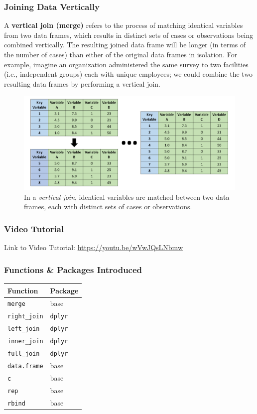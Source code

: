 \documentclass[]{book}
\begin{document}
\subsubsection{Joining Data Vertically}\label{joining-data-vertically}

A \textbf{vertical join (merge)} refers to the process of matching
identical variables from two data frames, which results in distinct sets
of cases or observations being combined vertically. The resulting joined
data frame will be longer (in terms of the number of cases) than either
of the original data frames in isolation. For example, imagine an
organization administered the same survey to two facilities (i.e.,
independent groups) each with unique employees; we could combine the two
resulting data frames by performing a vertical join.

\begin{figure}
\centering
\includegraphics{vertical_join.png}
\caption{In a \emph{vertical join}, identical variables are matched
between two data frames, each with distinct sets of cases or
observations.}
\end{figure}

\subsubsection{Video Tutorial}\label{video-tutorial}

Link to Video Tutorial: \url{https://youtu.be/wVwJQsLNbmw}

\subsubsection{Functions \& Packages
Introduced}\label{functions-packages-introduced}

\begin{longtable}[]{@{}ll@{}}
\toprule
Function & Package\tabularnewline
\midrule
\endhead
\texttt{merge} & base\tabularnewline
\texttt{right\_join} & \texttt{dplyr}\tabularnewline
\texttt{left\_join} & \texttt{dplyr}\tabularnewline
\texttt{inner\_join} & \texttt{dplyr}\tabularnewline
\texttt{full\_join} & \texttt{dplyr}\tabularnewline
\texttt{data.frame} & base\tabularnewline
\texttt{c} & base\tabularnewline
\texttt{rep} & base\tabularnewline
\texttt{rbind} & base\tabularnewline
\bottomrule
\end{longtable}
\end{document}
